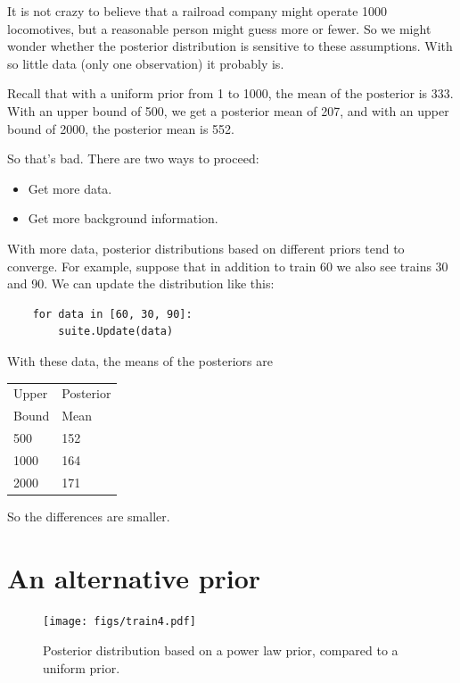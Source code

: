 \documentclass[12pt]{book}
\begin{document}
It is not crazy to believe that a railroad company might operate
1000 locomotives, but a reasonable person might guess more or fewer.
So we might wonder whether the posterior distribution is sensitive
to these assumptions.  With so little data (only one observation)
it probably is.

Recall that with a uniform prior from 1 to 1000, the mean of
the posterior is 333.  With an upper bound of 500, we get a
posterior mean of 207, and with an upper bound of 2000,
the posterior mean is 552.

So that's bad.  There are two ways to proceed:

\begin{itemize}

\item Get more data.

\item Get more background information.

\end{itemize}

With more data, posterior distributions based on different
priors tend to converge.  For example, suppose that in addition
to train 60 we also see trains 30 and 90.  We can update the
distribution like this:

\begin{verbatim}
    for data in [60, 30, 90]:
        suite.Update(data)
\end{verbatim}

With these data, the means of the posteriors are

  \begin{tabular}{|l|l|}
  \hline
  Upper & Posterior \\
  Bound & Mean \\
  \hline
  500 & 152 \\
  1000 & 164\\
  2000 & 171\\
  \hline
  \end{tabular}

So the differences are smaller.


\section{An alternative prior}

\begin{figure}
\centerline{\texttt{[image: figs/train4.pdf]}}
\caption{Posterior distribution based on a power law prior,
compared to a uniform prior.}
\label{fig.train4}
\end{figure}
\end{document}
